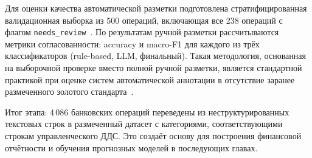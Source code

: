 Для оценки качества автоматической разметки подготовлена стратифицированная валидационная выборка из 500 операций, включающая все 238 операций с флагом \texttt{needs\_review}~\cite{pustejovsky2012natural}. По результатам ручной разметки рассчитываются метрики согласованности: accuracy и macro-F1 для каждого из трёх классификаторов (rule-based, LLM, финальный). Такая методология, основанная на выборочной проверке вместо полной ручной разметки, является стандартной практикой при оценке систем автоматической аннотации в отсутствие заранее размеченного золотого стандарта~\cite{pustejovsky2012natural}.

Итог этапа: 4\,086 банковских операций переведены из неструктурированных текстовых строк в размеченный датасет с категориями, соответствующими строкам управленческого ДДС. Это создаёт основу для построения финансовой отчётности и обучения прогнозных моделей в последующих главах.

